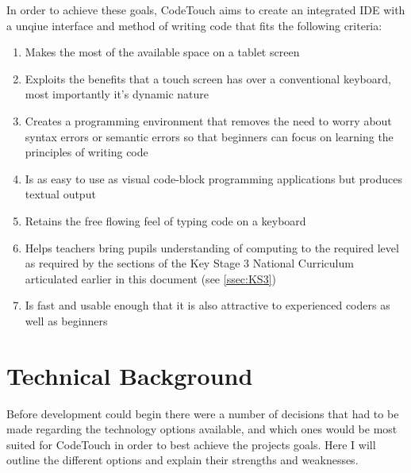 \documentclass[ %
                    author={Jonathan Rankin},
                supervisor={Dr. David May, Dr. Ian Holyer},
                    degree={MEng},
                     title={CodeTouch},
                  subtitle={A Revolutionary Way To Program Real Code On Touch Screen Devices},
                      type={enterprise},
                      year={2015 } ]{dissertation}
\begin{document}
In order to achieve these goals, CodeTouch aims to create an integrated IDE with a unqiue interface and method of writing code that fits the following criteria:



\begin{enumerate}
\item Makes the most of the available space on a tablet screen
\item Exploits the benefits that a touch screen has over a conventional keyboard, most importantly it's dynamic nature
\item Creates a programming environment that removes the need to worry about syntax errors or semantic errors so that beginners can focus on learning the principles of writing code
\item Is as easy to use as visual code-block programming applications but produces textual output
\item Retains the free flowing feel of typing code on a keyboard
\item Helps teachers bring pupils understanding of computing to the required level as required by the sections of the Key Stage 3 National Curriculum articulated earlier in this document (see \ref{ssec:KS3})
\item Is fast and usable enough that it is also attractive to experienced coders as well as beginners
\end{enumerate}





\chapter{Technical Background}
\label{chap:technical}


Before development could begin there were a number of decisions that had to be made regarding the technology options available, and which ones would be most suited for CodeTouch in order to best achieve the projects goals. Here I will outline the different options and explain their strengths and weaknesses. 
\end{document}
